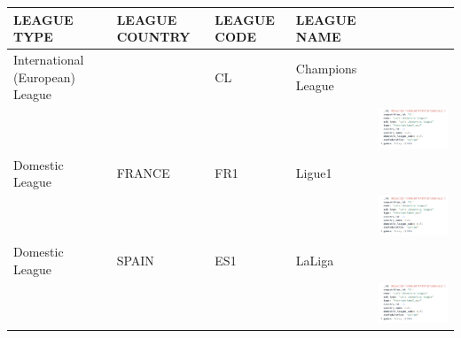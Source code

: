 \documentclass{Configuration_Files/PoliMi3i_thesis}
\begin{document}
\begin{tabular}{|p{3cm}|p{2cm}|p{2cm}|p{2cm}|p{7cm}|}
    \hline
    \textbf{LEAGUE TYPE}          & \textbf{LEAGUE COUNTRY} & \textbf{LEAGUE CODE} & \textbf{LEAGUE NAME} & \\ \hline
    International (European) League &                        & CL                   & Champions League  & \\
    & & & &\includegraphics[scale=0.85]{Images/Leagues analysed/CL.png}   \\ \hline
    Domestic League                & FRANCE                 & FR1                  & Ligue1             & \\
    & & & &\includegraphics[scale=0.85]{Images/Leagues analysed/CL.png}  \\ \hline
    Domestic League                & SPAIN                  & ES1                  & LaLiga              & \\
    & & & &\includegraphics[scale=0.85]{Images/Leagues analysed/CL.png} \\ \hline
    \end{tabular}
\end{document}
